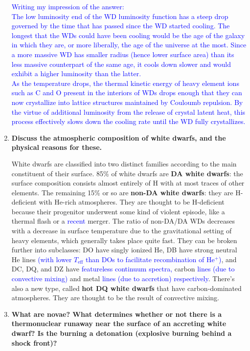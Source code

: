 \documentclass[a4paper]{article}
\begin{document}
\begin{enumerate}
\textcolor{blue}{Writing my impression of the answer:\\ The low luminosity end of the WD luminosity function has a steep drop governed by the time that has passed since the WD started cooling. The longest that the WDs could have been cooling would be the age of the galaxy in which they are, or more liberally, the age of the universe at the most. Since a more massive WD has smaller radius (hence lower surface area) than its less massive counterpart of the same age, it cools down slower and would exhibit a higher luminosity than the latter.\\
As the temperature drops, the thermal kinetic energy of heavy element ions such as C and O present in the interiors of WDs drops enough that they can now crystallize into lattice structures maintained by Couloumb repulsion. By the virtue of additional luminosity from the release of crystal latent heat, this process effectively slows down the cooling rate until the WD fully crystallizes.}

\item \textbf{Discuss the atmospheric composition of white dwarfs, and the physical reasons for these.}

White dwarfs are classified into two distinct families according to the main constituent of their surface. 85\% of white dwarfs are \textbf{DA white dwarfs}: the surface composition consists almost entirely of H with at most traces of other elements. The remaining 15\% or so are \textbf{non-DA white dwarfs}: they are H-deficient with He-rich atmospheres. They are thought to be H-deficient because their progenitor underwent some kind of violent episode, like a thermal flash or a \textcolor{blue}{recent} merger. The ratio of non-DA/DA WDs decreases with a decrease in surface temperature due to the gravitational setting of heavy elements, which generally takes place quite fast. They can be broken further into subclasses: DO have singly ionized He, DB have strong neutral He lines \textcolor{blue}{(with lower $T_\mathrm{eff}$ than DOs to facilitate recombination of He$^{+}$)}, and DC, DQ, and DZ have \textcolor{blue}{featureless continuum spectra,} carbon \textcolor{blue}{lines (due to convective mixing)} and metal \textcolor{blue}{lines (due to accretion) respectively}. There's also a new type, called \textbf{hot DQ white dwarfs} that have carbon-dominated atmospheres. They are thought to be the result of convective mixing.

\item \textbf{What are novae? What determines whether or not there is a thermonuclear runaway near the surface of an accreting white dwarf? Is the burning a detonation (explosive burning behind
a shock front)?}


\end{enumerate}
\end{document}
